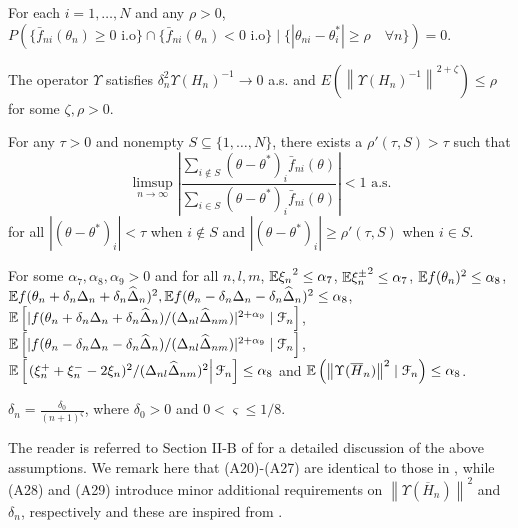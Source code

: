 \begin{pvn}
\item For each $i=1,\ldots,N$ and any $\rho>0$, 
$P(\{ \bar f_{ni} (\theta_n) \ge 0 \text{ i.o}\} \cap \{ \bar f_{ni} (\theta_n) < 0 \text{ i.o}\} \mid \{ |\theta_{ni} - \theta^*_i| \ge \rho\quad \forall n\}) =0.$

\item The operator $\Upsilon$ satisfies $\delta_n^2 \Upsilon(H_n)^{-1} \rightarrow 0$ a.s. and  $E(\left\| \Upsilon(H_n)^{-1}\right\|^{2+\zeta}) \le \rho$ for some $\zeta, \rho>0$.

\item For any $\tau >0$ and nonempty $S \subseteq \{1,\ldots,N\}$, there exists a $\rho'(\tau,S)>\tau$ such that 
$$ \limsup_{n\rightarrow \infty} \left| \dfrac{\sum_{i \notin S} (\theta-\theta^*)_i \bar f_{ni}(\theta)}{\sum_{i \in S} (\theta-\theta^*)_i \bar f_{ni}(\theta)}               \right| < 1 \text{ a.s.}$$
for all $|(\theta-\theta^*)_i| < \tau$ when $i \notin S$ and $|(\theta-\theta^*)_i| \ge \rho'(\tau,S)$ when $i\in S$.
\item For some $\alpha_7, \alpha_8, \alpha_9 >0$ and for all $n,l,m$, $\mathbb{E} {\xi_n}^{2} \le \alpha_7$, $\mathbb{E} {\xi_n^{\pm}}^{2} \le \alpha_7$, $\mathbb{E} f(\theta_n)^{2} \le \alpha_8$,  $\mathbb{E} f(\theta_n + \delta_n \Delta_n + \delta_n \widehat \Delta_n)^{2},\mathbb{E} f(\theta_n - \delta_n \Delta_n - \delta_n \widehat \Delta_n)^{2} \le \alpha_8$, 
$\mathbb{E} \left[| f(\theta_n + \delta_n \Delta_n + \delta_n \widehat \Delta_n)/ (\Delta_{nl}\widehat\Delta_{nm})|^{2+\alpha_9} \mid \mathcal{F}_n\right]$,
$\mathbb{E} \left[ |f(\theta_n - \delta_n \Delta_n - \delta_n \widehat \Delta_n)/ (\Delta_{nl}\widehat\Delta_{nm})|^{2+\alpha_9} \mid \mathcal{F}_n\right]$,
 $\mathbb{E}\left[\left. (\xi_n^+ + \xi_n^- - 2 \xi_n)^2/(\Delta_{nl}\widehat\Delta_{nm})^2 \right| \mathcal{F}_n \right] \le \alpha_8$ 
and $\mathbb{E} \left(\left\| \Upsilon(\overline H_n) \right\|^2 \mid \mathcal{F}_n\right) \le \alpha_8$. 
\item  $\delta_n = \frac{\delta_0}{(n+1)^{\varsigma}}$, where $\delta_0 > 0$ and $0 < \varsigma \le 1/8$.
\end{pvn}
The reader is referred to Section II-B of \cite{prashanth2015rdsa} for a detailed discussion of the above assumptions. We remark here that (A20)-(A27) are identical to those in \cite{prashanth2015rdsa}, while (A28) and (A29) introduce minor additional requirements on $\left\| \Upsilon(\overline H_n) \right\|^2$ and $\delta_n$, respectively and these are inspired from \cite{spall-jacobian}.

